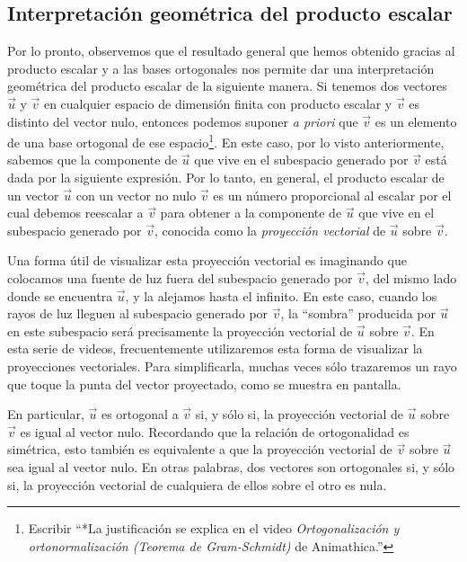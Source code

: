 \documentclass[12pt,dvipsnames]{article}
\numberwithin{equation}{section}
\begin{document}
\subsection{Interpretación geométrica del producto escalar} %

Por lo pronto, observemos que el resultado general que hemos obtenido gracias al producto escalar y a las bases ortogonales nos permite dar una interpretación geométrica del producto escalar de la siguiente manera. Si tenemos dos vectores $\vec{u}$ y $\vec{v}$ en cualquier espacio de dimensión finita con producto escalar y $\vec{v}$ es distinto del vector nulo, entonces podemos suponer \emph{a priori} que $\vec{v}$ es un elemento de una base ortogonal de ese espacio\footnote{Escribir ``*La justificación se explica en el video \emph{Ortogonalización y ortonormalización (Teorema de Gram-Schmidt)} de Animathica.''}. En este caso, por lo visto anteriormente, sabemos que la componente de $\vec{u}$ que vive en el subespacio generado por $\vec{v}$ está dada por la siguiente expresión. Por lo tanto, en general, el producto escalar de un vector $\vec{u}$ con un vector no nulo $\vec{v}$ es un número proporcional al escalar por el cual debemos reescalar a $\vec{v}$ para obtener a la componente de $\vec{u}$ que vive en el subespacio generado por $\vec{v}$, conocida como la \emph{proyección vectorial} de $\vec{u}$ sobre $\vec{v}$.

Una forma útil de visualizar esta proyección vectorial es imaginando que colocamos una fuente de luz fuera del subespacio generado por $\vec{v}$, del mismo lado donde se encuentra $\vec{u}$, y la alejamos hasta el infinito. En este caso, cuando los rayos de luz lleguen al subespacio generado por $\vec{v}$, la ``sombra'' producida por $\vec{u}$ en este subespacio será precisamente la proyección vectorial de $\vec{u}$ sobre $\vec{v}$. En esta serie de videos, frecuentemente utilizaremos esta forma de visualizar la proyecciones vectoriales. Para simplificarla, muchas veces sólo trazaremos un rayo que toque la punta del vector proyectado, como se muestra en pantalla.

En particular, $\vec{u}$ es ortogonal a $\vec{v}$ si, y sólo si, la proyección vectorial de $\vec{u}$ sobre $\vec{v}$ es igual al vector nulo. Recordando que la relación de ortogonalidad es simétrica, esto también es equivalente a que la proyección vectorial de $\vec{v}$ sobre $\vec{u}$ sea igual al vector nulo. En otras palabras, dos vectores son ortogonales si, y sólo si, la proyección vectorial de cualquiera de ellos sobre el otro es nula.
\end{document}
